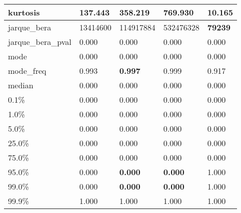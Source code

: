 \begin{table}[H]
\begin{tabular}{|l|m{10em}|m{10em}|m{10em}|m{10em}|}
\hline kurtosis & 137.443 & 358.219 & \cellcolor[rgb]{0.9, 0.54, 0.52} 769.930 & \bfseries 10.165 \\
\hline jarque\_bera & 13414600 & 114917884 & \cellcolor[rgb]{0.9, 0.54, 0.52} 532476328 & \bfseries 79239 \\
\hline jarque\_bera\_pval & 0.000 & 0.000 & 0.000 & 0.000 \\
\hline mode & 0.000 & 0.000 & 0.000 & 0.000 \\
\hline mode\_freq & 0.993 & \bfseries 0.997 & 0.999 & \cellcolor[rgb]{0.9, 0.54, 0.52} 0.917 \\
\hline median & 0.000 & 0.000 & 0.000 & 0.000 \\
\hline 0.1\% & 0.000 & 0.000 & 0.000 & 0.000 \\
\hline 1.0\% & 0.000 & 0.000 & 0.000 & 0.000 \\
\hline 5.0\% & 0.000 & 0.000 & 0.000 & 0.000 \\
\hline 25.0\% & 0.000 & 0.000 & 0.000 & 0.000 \\
\hline 75.0\% & 0.000 & 0.000 & 0.000 & 0.000 \\
\hline 95.0\% & 0.000 & \bfseries 0.000 & \bfseries 0.000 & \cellcolor[rgb]{0.9, 0.54, 0.52} 1.000 \\
\hline 99.0\% & 0.000 & \bfseries 0.000 & \bfseries 0.000 & \cellcolor[rgb]{0.9, 0.54, 0.52} 1.000 \\
\hline 99.9\% & 1.000 & 1.000 & 1.000 & 1.000 \\
\hline
\end{tabular}
\end{table}
